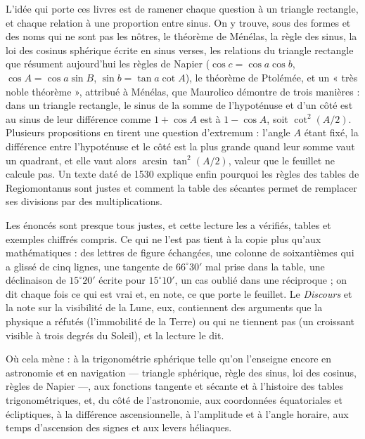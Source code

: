\documentclass[11pt,a4paper]{article}
\begin{document}
\begin{resume}
L'idée qui porte ces livres est de ramener chaque question à un triangle
rectangle, et chaque relation à une proportion entre sinus. On y trouve, sous des
formes et des noms qui ne sont pas les nôtres, le théorème de Ménélas, la règle des
sinus, la loi des cosinus sphérique écrite en sinus verses, les relations du
triangle rectangle que résument aujourd'hui les règles de Napier
($\cos c = \cos a\cos b$, $\cos A = \cos a\sin B$, $\sin b = \tan a\cot A$), le
théorème de Ptolémée, et un « très noble théorème », attribué à Ménélas, que
Maurolico démontre de trois manières : dans un triangle rectangle, le sinus de la
somme de l'hypoténuse et d'un côté est au sinus de leur différence comme
$1 + \cos A$ est à $1 - \cos A$, soit $\cot^2(A/2)$. Plusieurs propositions en tirent
une question d'extremum : l'angle $A$ étant fixé, la différence entre
l'hypoténuse et le côté est la plus grande quand leur somme vaut un quadrant, et
elle vaut alors $\arcsin\tan^2(A/2)$, valeur que le feuillet ne calcule pas. Un texte daté de 1530 explique enfin
pourquoi les règles des tables de Regiomontanus sont justes et comment la table
des sécantes permet de remplacer ses divisions par des multiplications.

Les énoncés sont presque tous justes, et cette lecture les a vérifiés, tables et
exemples chiffrés compris. Ce qui ne l'est pas tient à la copie plus qu'aux mathématiques :
des lettres de figure échangées, une colonne de soixantièmes qui a glissé de cinq
lignes, une tangente de $66^\circ 30'$ mal prise dans la table, une déclinaison de
$15^\circ 20'$ écrite pour $15^\circ 10'$, un cas oublié dans une réciproque ; on dit
chaque fois ce qui est vrai et, en note, ce que porte le feuillet. Le
\emph{Discours} et la note sur la visibilité de la Lune, eux, contiennent des
arguments que la physique a réfutés (l'immobilité de la Terre) ou qui ne tiennent
pas (un croissant visible à trois degrés du Soleil), et la lecture le dit.

Où cela mène : à la trigonométrie sphérique telle qu'on l'enseigne encore en
astronomie et en navigation — triangle sphérique, règle des sinus, loi des
cosinus, règles de Napier —, aux fonctions tangente et sécante et à l'histoire des tables
trigonométriques, et, du côté de l'astronomie, aux coordonnées équatoriales et
écliptiques, à la différence ascensionnelle, à l'amplitude et à l'angle horaire,
aux temps d'ascension des signes et aux levers héliaques.

\end{resume}
\end{document}
